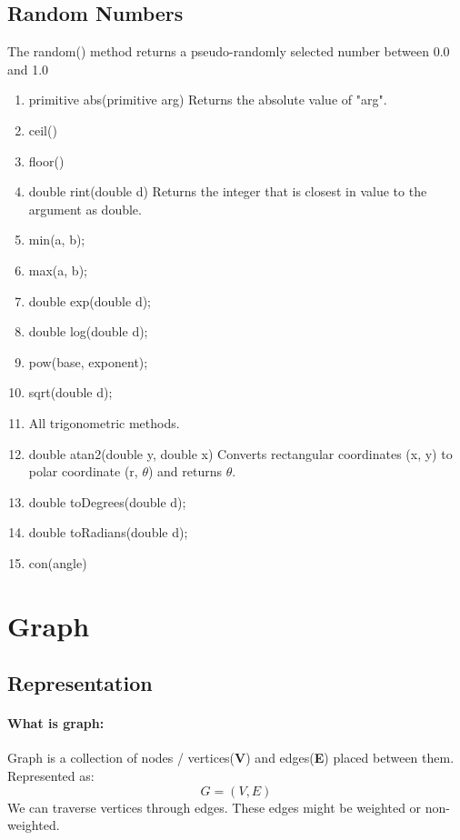 \subsection{Random Numbers}
The random() method returns a pseudo-randomly selected number between 0.0 and 1.0
	\begin{enumerate}
		\item primitive abs(primitive arg) Returns the absolute value of "arg".
		\item ceil()
		\item floor()
		\item double rint(double d) Returns the integer that is closest in value to the argument as double.
		\item min(a, b);
		\item max(a, b);
		\item double exp(double d);
		\item double log(double d);
		\item pow(base, exponent);
		\item sqrt(double d);
		\item All trigonometric methods.
		\item double atan2(double y, double x) Converts rectangular coordinates (x, y) to polar coordinate (r, $\theta$) and returns $\theta$.
		\item double toDegrees(double d);
		\item double toRadians(double d);
		\item con(angle)
	\end{enumerate}

\section{Graph}

\subsection{Representation}

\paragraph{What is graph:}
Graph is a collection of nodes / vertices(\textbf{V}) and edges(\textbf{E}) placed between them. Represented as: $$G = (V, E)$$ We can traverse vertices through edges. These edges might be weighted or non-weighted.

